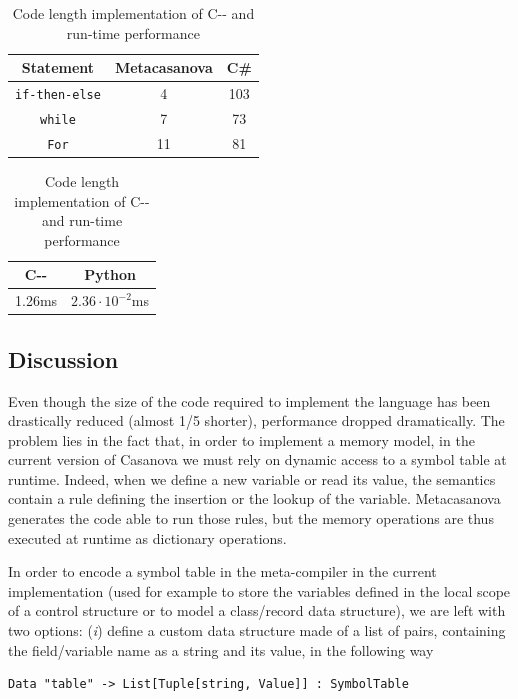\begin{table}
	\centering
	\begin{tabular}{|c|c|c|}
		\hline
		\textbf{Statement} & \textbf{Metacasanova} & \textbf{C\#}\\
		\hline
		\texttt{if-then-else} & 4 & 103 \\
		\hline
		\texttt{while} & 7 & 73 \\
		\hline
		\texttt{For} & 11 & 81\\
		\hline
	\end{tabular}
	
	\vspace{0.15cm}
	\begin{tabular}{|c|c|}
		\hline
		\textbf{C-{}-} & \textbf{Python} \\
		\hline
		1.26ms & $2.36 \cdot 10^{-2}$ms \\
		\hline
	\end{tabular}
	\caption{Code length implementation of C-{}- and run-time performance}
	\label{tab:mcnv_languages_cmm}
\end{table}

\subsection{Discussion}
\label{subsec:code_generation_discussion}
Even though the size of the code required to implement the language has been drastically reduced (almost 1/5 shorter), performance dropped dramatically. The problem lies in the fact that, in order to implement a memory model, in the current version of Casanova we must rely on dynamic access to a symbol table at runtime. Indeed, when we define a new variable or read its value, the semantics contain a rule defining the insertion or the lookup of the variable. Metacasanova generates the code able to run those rules, but the memory operations are thus executed at runtime as dictionary operations.

In order to encode a symbol table in the meta-compiler in the current implementation (used for example to store the variables defined in the local scope of a control structure or to model a class/record data structure), we are left with two options: (\textit{i}) define a custom data structure made of a list of pairs, containing the field/variable name as a string and its value, in the following way

\begin{lstlisting}
Data "table" -> List[Tuple[string, Value]] : SymbolTable
\end{lstlisting}

